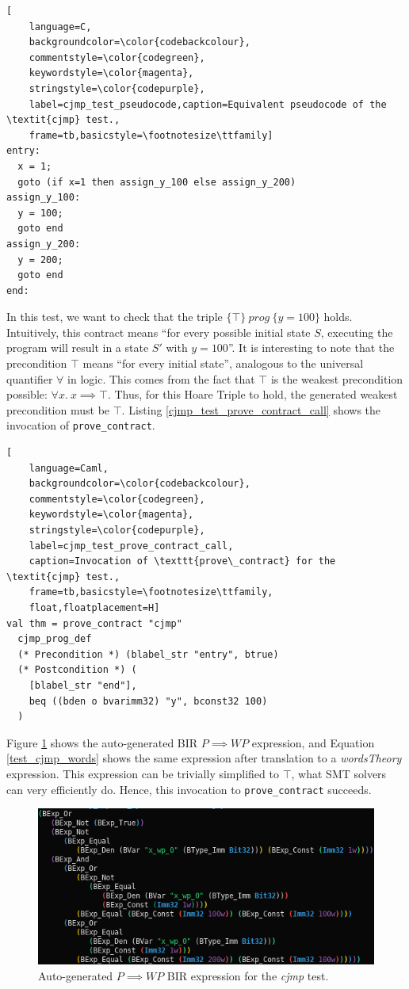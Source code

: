 \documentclass{kththesis}
\newcommand{\htriple}[3]{\ensuremath{\{#1\}~#2~\{#3\}}}
\newcommand{\WP}{\ensuremath{\mathit{WP}}}
\begin{document}
{\begin{lstlisting}[
    language=C,
    backgroundcolor=\color{codebackcolour},
    commentstyle=\color{codegreen},
    keywordstyle=\color{magenta},
    stringstyle=\color{codepurple},
    label=cjmp_test_pseudocode,caption=Equivalent pseudocode of the \textit{cjmp} test.,
    frame=tb,basicstyle=\footnotesize\ttfamily]
entry:
  x = 1;
  goto (if x=1 then assign_y_100 else assign_y_200)
assign_y_100:
  y = 100;
  goto end
assign_y_200:
  y = 200;
  goto end
end:
\end{lstlisting}

In this test, we want to check that the triple \htriple{\top}{prog}{y = 100} holds. Intuitively, this contract means ``for every possible initial state $S$, executing the program will result in a state $S'$ with $y=100$''. It is interesting to note that the precondition $\top$ means ``for every initial state'', analogous to the universal quantifier $\forall$ in logic. This comes from the fact that $\top$ is the weakest precondition possible: $\forall x.~x \implies \top$. Thus, for this Hoare Triple to hold, the generated weakest precondition must be $\top$. Listing \ref{cjmp_test_prove_contract_call} shows the invocation of \texttt{prove\_contract}.

\begin{lstlisting}[
    language=Caml,
    backgroundcolor=\color{codebackcolour},
    commentstyle=\color{codegreen},
    keywordstyle=\color{magenta},
    stringstyle=\color{codepurple},
    label=cjmp_test_prove_contract_call,
    caption=Invocation of \texttt{prove\_contract} for the \textit{cjmp} test.,
    frame=tb,basicstyle=\footnotesize\ttfamily,
    float,floatplacement=H]
val thm = prove_contract "cjmp"
  cjmp_prog_def
  (* Precondition *) (blabel_str "entry", btrue)
  (* Postcondition *) (
    [blabel_str "end"],
    beq ((bden o bvarimm32) "y", bconst32 100)
  )
\end{lstlisting}

Figure \ref{test_cjmp_bir} shows the auto-generated BIR $P \implies \WP$ expression, and Equation \ref{test_cjmp_words} shows the same expression after translation to a \textit{wordsTheory} expression. This expression can be trivially simplified to $\top$, what SMT solvers can very efficiently do. Hence, this invocation to \texttt{prove\_contract} succeeds.

\begin{figure}[!h]
	\includegraphics[width=\textwidth]{figures/test_cjmp_bir.png}
	\centering
	\caption{Auto-generated $P \implies \WP$ BIR expression for the \textit{cjmp} test.}
	\label{test_cjmp_bir}
\end{figure}

}
\end{document}

